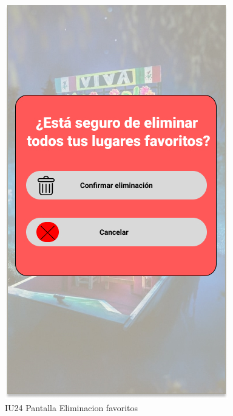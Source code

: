 \begin{figure}[h]
    \begin{minipage}{0.5\textwidth}
        \centering
        \includegraphics[width=.7\linewidth]{Pantallas Prototipo3/IU24 Pantalla Eliminacion favoritos.jpg}
        \caption{IU24 Pantalla Eliminacion favoritos}
    \end{minipage}%
\end{figure}

